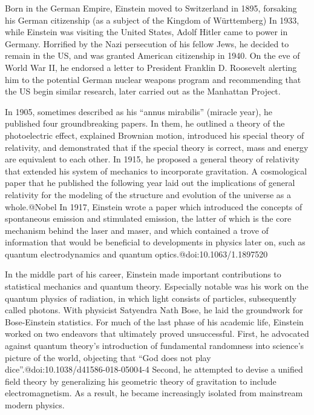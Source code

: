\documentclass[twoside]{memoir}
\begin{document}
Born in the German Empire, Einstein moved to Switzerland in 1895, forsaking his German citizenship (as a subject of the Kingdom of Württemberg) In 1933, while Einstein was visiting the United States, Adolf Hitler came to power in Germany. Horrified by the Nazi persecution of his fellow Jews,\cite{zE9Bz} he decided to remain in the US, and was granted American citizenship in 1940. On the eve of World War II, he endorsed a letter to President Franklin D. Roosevelt alerting him to the potential German nuclear weapons program and recommending that the US begin similar research, later carried out as the Manhattan Project.

In 1905, sometimes described as his \enquote{annus mirabilis} (miracle year), he published four groundbreaking papers. In them, he outlined a theory of the photoelectric effect, explained Brownian motion, introduced his special theory of relativity, and demonstrated that if the special theory is correct, mass and energy are equivalent to each other. In 1915, he proposed a general theory of relativity that extended his system of mechanics to incorporate gravitation. A cosmological paper that he published the following year laid out the implications of general relativity for the modeling of the structure and evolution of the universe as a whole.@Nobel In 1917, Einstein wrote a paper which introduced the concepts of spontaneous emission and stimulated emission, the latter of which is the core mechanism behind the laser and maser, and which contained a trove of information that would be beneficial to developments in physics later on, such as quantum electrodynamics and quantum optics.@doi:10.1063/1.1897520

In the middle part of his career, Einstein made important contributions to statistical mechanics and quantum theory. Especially notable was his work on the quantum physics of radiation, in which light consists of particles, subsequently called photons. With physicist Satyendra Nath Bose, he laid the groundwork for Bose-Einstein statistics. For much of the last phase of his academic life, Einstein worked on two endeavors that ultimately proved unsuccessful. First, he advocated against quantum theory's introduction of fundamental randomness into science's picture of the world, objecting that \enquote{God does not play dice}.@doi:10.1038/d41586-018-05004-4 Second, he attempted to devise a unified field theory by generalizing his geometric theory of gravitation to include electromagnetism. As a result, he became increasingly isolated from mainstream modern physics.
\end{document}
